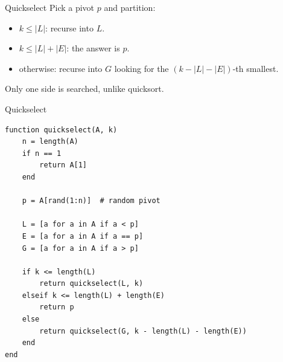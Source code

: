 \documentclass[10pt,aspectratio=169]{beamer}
\begin{document}
\begin{frame}{Quickselect}
  Pick a \alert{pivot} $p$ and partition:

  \bigskip
  \begin{center}
  \end{center}

  \bigskip
  \begin{itemize}
    \item $k \le |L|$: \; recurse into $L$.
    \item $k \le |L| + |E|$: \; the answer is $p$.
    \item otherwise: \; recurse into $G$ looking for the $(k - |L| - |E|)$-th smallest.
  \end{itemize}

  \bigskip
  \begin{center}
    \small Only \alert{one} side is searched, unlike quicksort.
  \end{center}
\end{frame}

\begin{frame}[fragile]{Quickselect}
  \begin{lstlisting}
function quickselect(A, k)
    n = length(A)
    if n == 1
        return A[1]
    end

    p = A[rand(1:n)]  # random pivot

    L = [a for a in A if a < p]
    E = [a for a in A if a == p]
    G = [a for a in A if a > p]

    if k <= length(L)
        return quickselect(L, k)
    elseif k <= length(L) + length(E)
        return p
    else
        return quickselect(G, k - length(L) - length(E))
    end
end
  \end{lstlisting}
\end{frame}
\end{document}
